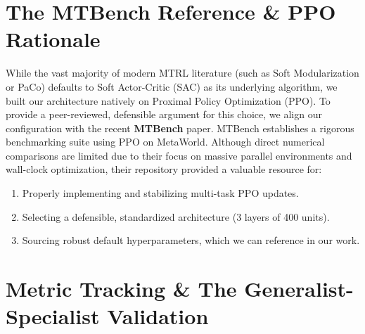 \documentclass[11pt,a4paper]{article}
\begin{document}
\section{The MTBench Reference & PPO Rationale}
While the vast majority of modern MTRL literature (such as Soft Modularization or PaCo) defaults to Soft Actor-Critic (SAC) as its underlying algorithm, we built our architecture natively on Proximal Policy Optimization (PPO). 
To provide a peer-reviewed, defensible argument for this choice, we align our configuration with the recent \textbf{MTBench} paper. MTBench establishes a rigorous benchmarking suite using PPO on MetaWorld. Although direct numerical comparisons are limited due to their focus on massive parallel environments and wall-clock optimization, their repository provided a valuable resource for:
\begin{enumerate}
    \item Properly implementing and stabilizing multi-task PPO updates.
    \item Selecting a defensible, standardized architecture (3 layers of 400 units).
    \item Sourcing robust default hyperparameters, which we can reference in our work.
\end{enumerate}
\section{Metric Tracking \& The Generalist-Specialist Validation}
\end{document}
